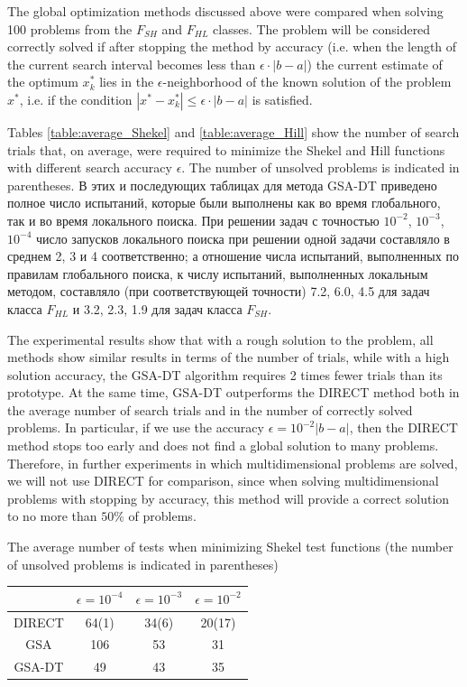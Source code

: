 \documentclass[entropy,article,submit,moreauthors,pdftex]{Definitions/mdpi}
\begin{document}
The global optimization methods discussed above were compared when solving 100 problems from the  $F_{SH}$ and $F_{HL}$ classes. The problem will be considered correctly solved if after stopping the method by accuracy (i.e. when the length of the current search interval becomes less than $\epsilon \cdot \left|b-a\right| $) the current estimate of the optimum  $x_k^*$ lies in the $\epsilon$-neighborhood of the known solution of the problem  $x^*$, i.e. if the condition  $|x^*-x_k^*| \leq \epsilon \cdot \left|b-a\right|$ is satisfied.

Tables \ref{table:average_Shekel} and \ref{table:average_Hill} show the number of search trials that, on average, were required to minimize the Shekel and Hill functions with different search accuracy  $\epsilon$. The number of unsolved problems is indicated in parentheses. 
В этих и последующих таблицах для метода GSA-DT приведено полное число испытаний, которые были выполнены как во время глобального, так и во время локального поиска.
При решении задач с точностью $10^{-2}$, $10^{-3}$, $10^{-4}$ число запусков локального поиска при решении одной задачи составляло в среднем 2, 3 и 4 соответственно; а отношение числа испытаний, выполненных по правилам глобального поиска, к числу испытаний, выполненных локальным методом, составляло (при соответствующей точности) 7.2, 6.0, 4.5 для задач класса $F_{HL}$ и 3.2, 2.3, 1.9 для задач класса $F_{SH}$.

The experimental results show that with a rough solution to the problem, all methods show similar results in terms of the number of trials, while with a high solution accuracy, the GSA-DT algorithm requires 2 times fewer trials than its prototype. At the same time, GSA-DT outperforms the DIRECT method both in the average number of search trials and in the number of correctly solved problems. In particular, if we use the accuracy $\epsilon = 10^{-2}\left|b-a\right|$, then the DIRECT method stops too early and does not find a global solution to many problems. 
Therefore, in further experiments in which multidimensional problems are solved, we will not use DIRECT for comparison, since when solving multidimensional problems with stopping by accuracy, this method will provide a correct solution to no more than  $50\%$ of problems.


\begin{specialtable}[H] 
	\caption{The average number of tests when minimizing Shekel test functions (the number of unsolved problems is indicated in parentheses)}\label{table:average_Shekel}
	\center
\begin{tabular}{cccc}
\toprule
        & \textbf{$\epsilon = 10^{-4}$} & \textbf{$\epsilon = 10^{-3}$} & \textbf{$\epsilon = 10^{-2}$} \\
\midrule													
DIRECT         & 64(1) &  34(6)   & 20(17)    \\
GSA            & 106  & 53  &  31   \\ 
GSA-DT         & 49   & 43  &  35   \\

\bottomrule
\end{tabular}
\end{specialtable}
\end{document}

